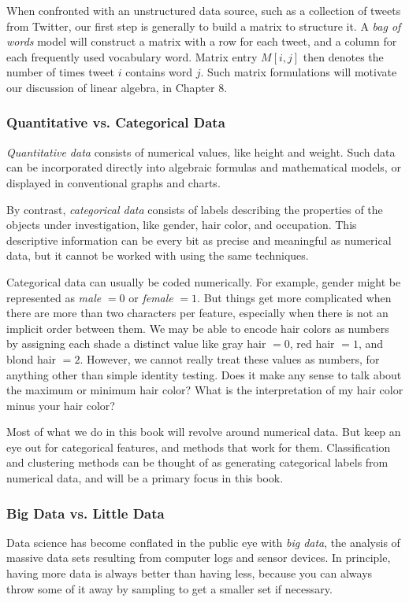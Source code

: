 \documentclass[10pt]{article}
\begin{document}
When confronted with an unstructured data source, such as a collection of tweets from Twitter, our first step is generally to build a matrix to structure it. A \textit{bag of words} model will construct a matrix with a row for each tweet, and a column for each frequently used vocabulary word. Matrix entry \(M[i, j]\) then denotes the number of times tweet \(i\) contains word \(j\). Such matrix formulations will motivate our discussion of linear algebra, in Chapter 8.

\subsubsection{Quantitative vs. Categorical Data}
\textit{Quantitative data} consists of numerical values, like height and weight. Such data can be incorporated directly into algebraic formulas and mathematical models, or displayed in conventional graphs and charts.

By contrast, \textit{categorical data} consists of labels describing the properties of the objects under investigation, like gender, hair color, and occupation. This descriptive information can be every bit as precise and meaningful as numerical data, but it cannot be worked with using the same techniques.

Categorical data can usually be coded numerically. For example, gender might be represented as \textit{male} \(=0\) or \textit{female} \(=1\). But things get more complicated when there are more than two characters per feature, especially when there is not an implicit order between them. We may be able to encode hair colors as numbers by assigning each shade a distinct value like gray hair \(=0\), red hair \(=1\), and blond hair \(=2\). However, we cannot really treat these values as numbers, for anything other than simple identity testing. Does it make any sense to talk about the maximum or minimum hair color? What is the interpretation of my hair color minus your hair color?

Most of what we do in this book will revolve around numerical data. But keep an eye out for categorical features, and methods that work for them. Classification and clustering methods can be thought of as generating categorical labels from numerical data, and will be a primary focus in this book.

\subsubsection{Big Data vs. Little Data}
Data science has become conflated in the public eye with \textit{big data}, the analysis of massive data sets resulting from computer logs and sensor devices. In principle, having more data is always better than having less, because you can always throw some of it away by sampling to get a smaller set if necessary.
\end{document}
